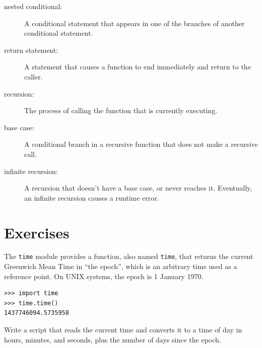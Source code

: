 \documentclass[10pt]{book}
\begin{document}
\begin{description}
\item[nested conditional:]  A conditional statement that appears
in one of the branches of another conditional statement.

\item[return statement:] A statement that causes a function to
end immediately and return to the caller.

\item[recursion:]  The process of calling the function that is
currently executing.

\item[base case:]  A conditional branch in a
recursive function that does not make a recursive call.

\item[infinite recursion:]  A recursion that doesn't have a
base case, or never reaches it.  Eventually, an infinite recursion
causes a runtime error.

\end{description}

\section{Exercises}

\begin{exercise}

The {\tt time} module provides a function, also named {\tt time}, that
returns the current Greenwich Mean Time in ``the epoch'', which is
an arbitrary time used as a reference point.  On UNIX systems, the
epoch is 1 January 1970.

\begin{verbatim}
>>> import time
>>> time.time()
1437746094.5735958
\end{verbatim}

Write a script that reads the current time and converts it to
a time of day in hours, minutes, and seconds, plus the number of
days since the epoch.

\end{exercise}
\end{document}
